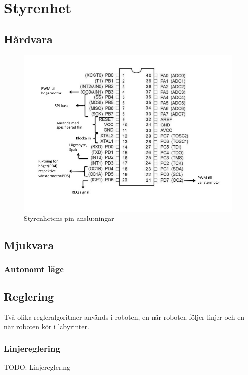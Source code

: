 \section{Styrenhet}

\subsection{Hårdvara}

\begin{figure}[H]
  \centering
 \includegraphics[angle=0,scale=0.5]{bilder/PIN_styr.jpg}
  \caption{Styrenhetens pin-anslutningar}
  \label{fig:PINstyr}
\end{figure}


\subsection{Mjukvara}

\subsubsection{Autonomt läge}

\subsection{Reglering}
Två olika regleralgoritmer används i roboten, en när roboten följer linjer och
en när roboten kör i labyrinter.
\subsubsection{Linjereglering}
TODO: Linjereglering
